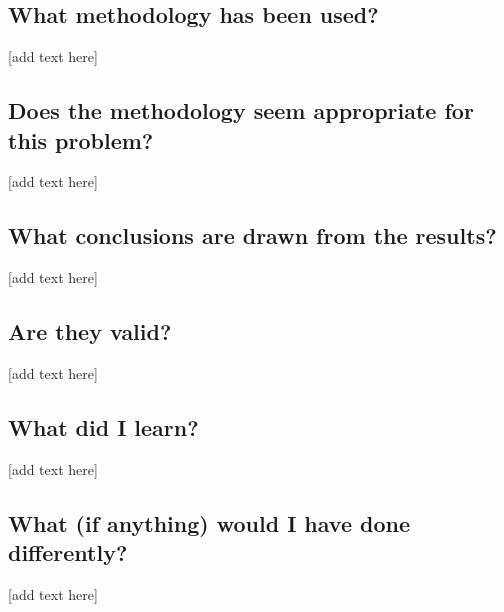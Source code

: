 \documentclass[11pt,a4paper]{article}
\begin{document}
\subsection*{What methodology has been used?}
[add text here]

\subsection*{Does the methodology seem appropriate for this problem?}
[add text here]

\subsection*{What conclusions are drawn from the results?}
[add text here]

\subsection*{Are they valid?}
[add text here]

\subsection*{What did I learn?}
[add text here]

\subsection*{What (if anything) would I have done differently?}
[add text here]
\end{document}
